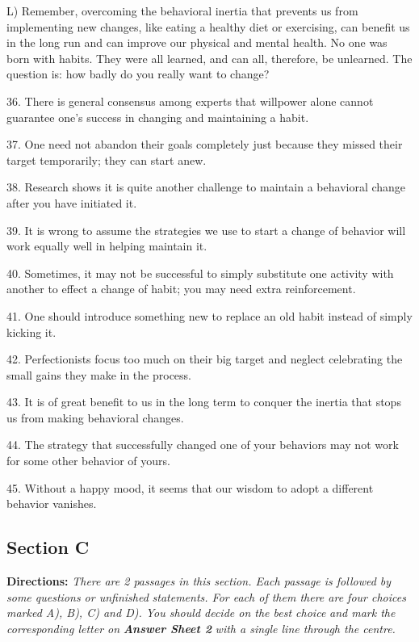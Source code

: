 \documentclass[UTF8,11pt]{ctexart}
\begin{document}
L) Remember, overcoming the behavioral inertia that prevents us from implementing new changes, like eating a healthy diet or exercising, can benefit us in the long run and can improve our physical and mental health. No one was born with habits. They were all learned, and can all, therefore, be unlearned. The question is: how badly do you really want to change?


36. There is general consensus among experts that willpower alone cannot guarantee one’s success in changing and maintaining a habit.


37. One need not abandon their goals completely just because they missed their target temporarily; they can start anew.


38. Research shows it is quite another challenge to maintain a behavioral change after you have initiated it.


39. It is wrong to assume the strategies we use to start a change of behavior will work equally well in helping maintain it.


40. Sometimes, it may not be successful to simply substitute one activity with another to effect a change of habit; you may need extra reinforcement.


41. One should introduce something new to replace an old habit instead of simply kicking it.


42. Perfectionists focus too much on their big target and neglect celebrating the small gains they make in the process.


43. It is of great benefit to us in the long term to conquer the inertia that stops us from making behavioral changes.


44. The strategy that successfully changed one of your behaviors may not work for some other behavior of yours.


45. Without a happy mood, it seems that our wisdom to adopt a different behavior vanishes.


\subsection*{\textbf{Section C}}


\textbf{Directions: }\textit{There are 2 passages in this section. Each passage is followed by some questions or unfinished} \textit{statements. For each of them there are four choices marked A), B), C) and D). You should decide on the best choice} \textit{and mark the corresponding letter on }\textbf{\textit{Answer Sheet 2}}\textit{ with a single line through the centre.}
\end{document}
